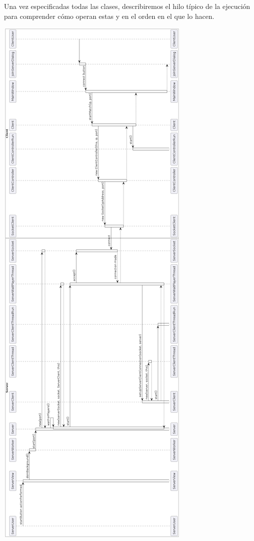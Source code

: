 \documentclass[../DocumentoOficial.tex]{subfiles}
\begin{document}
Una vez especificadas todas las clases, describiremos el hilo típico de la ejecución para comprender cómo operan estas y en el orden en el que lo hacen.

\begin{center}
\includegraphics[scale=0.4]{conexionesUmlSprint7.png}
\end{center}
\end{document}
